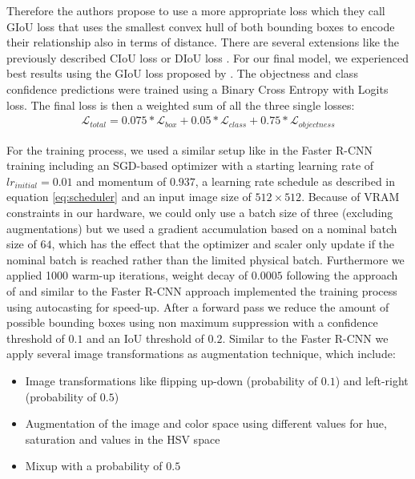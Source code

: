 Therefore the authors propose to use a more appropriate loss which they call \ac{GIoU} loss that uses the smallest convex hull of both bounding boxes to encode their relationship also in terms of distance. There are several extensions like the previously described \ac{CIoU} loss \autocite{zheng_enhancing_2021} or \ac{DIoU} loss \autocite{DIoU}. For our final model, we experienced best results using the \ac{GIoU} loss proposed by \citeauthor{giou}.
The objectness and class confidence predictions were trained using a Binary Cross Entropy with Logits loss. The final loss is then a weighted sum of all the three single losses:
\begin{align}
	\mathcal{L}_{total} = 0.075 * \mathcal{L}_{box} + 0.05 * \mathcal{L}_{class} + 0.75* \mathcal{L}_{objectness}
\end{align} 

For the training process, we used a similar setup like in the Faster \ac{R-CNN} training including an \acs{SGD}-based optimizer with a starting learning rate of $lr_{initial} = 0.01$ and momentum of $0.937$, a learning rate schedule as described in equation \ref{eq:scheduler} and an input image size of $512 \times 512$. Because of VRAM constraints in our hardware, we could only use a batch size of three (excluding augmentations) but we used a gradient accumulation based on a nominal batch size of $64$, which has the effect that the optimizer and scaler only update if the nominal batch is reached rather than the limited physical batch.
Furthermore we applied \num{1000} warm-up iterations, weight decay of $0.0005$ following the approach of \autocite{yolov5} and similar to the Faster \ac{R-CNN} approach implemented the training process using autocasting for speed-up. After a forward pass we reduce the amount of possible bounding boxes using non maximum suppression with a confidence threshold of $0.1$ and an \acs{IoU} threshold of $0.2$.
Similar to the Faster \ac{R-CNN} we apply several image transformations as augmentation technique, which include:
\begin{itemize}
	\item Image transformations like flipping up-down (probability of $0.1$) and left-right (probability of $0.5$)
	\item Augmentation of the image and color space using different values for hue, saturation and values in the HSV space
	\item Mixup \autocite{zhang2017mixup} with a probability of $0.5$
\end{itemize}

